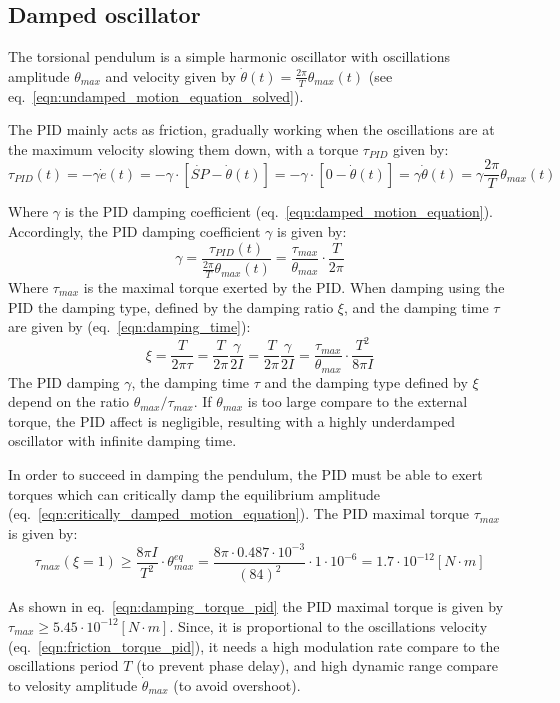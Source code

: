 \documentclass[\main/master.tex]{subfiles}
\begin{document}
\subsection{Damped oscillator}
The torsional pendulum is a simple harmonic oscillator with oscillations amplitude $\theta_{max}$ and velocity given by $\dot{\theta}(t) =\frac{2\pi}{T} \theta_{max}( t)$ (see eq.~\ref{eqn:undamped_motion_equation_solved}). 
\par\noindent
The PID mainly acts as friction, gradually working when the oscillations are at the maximum velocity slowing them down, with a torque $\tau_{PID}$ given by:
\begin{equation}
\tau_{PID}(t) = -\gamma\dot{e}(t) =  -\gamma\cdot [\dot{SP} -\dot{\theta}(t)] =-\gamma\cdot [0-\dot{\theta}(t)]  =  \gamma\dot{\theta}(t) =  \gamma\frac{2\pi}{T} \theta_{max}( t) 
\label{eqn:friction_torque_pid}
\end{equation}
\par\noindent
Where $\gamma$ is the PID damping coefficient (eq.~\ref{eqn:damped_motion_equation}). Accordingly, the PID damping coefficient $\gamma$ is given by:
\begin{equation}
\gamma  =  \frac{\tau_{PID}(t)}{\frac{2\pi}{T} \theta_{max}( t) } =\frac{\tau_{max}}{\theta_{max}}\cdot \frac{ T}{2\pi}          \label{eqn:damped_pid_motion_equation_2}
\end{equation}
Where $\tau_{max}$ is the maximal torque exerted by the PID. When damping using the PID the damping type, defined by the damping ratio $\xi$, and the damping time $\tau$ are given by (eq.~\ref{eqn:damping_time}):
\begin{equation}
\xi = \frac{T}{2 \pi \tau } =  \frac{T}{2 \pi  }\frac{\gamma}{2I} =\frac{T}{2 \pi  }\frac{\gamma}{2I} = \frac{ \tau_{max}}{\theta_{max}} \cdot \frac{T^2}{8\pi I}  \label{eqn:damping_time_pid}
\end{equation}
The PID damping $\gamma$, the damping time $\tau$ and the damping type defined by $\xi$ depend on the ratio $\theta_{max}/\tau_{max}$. If $\theta_{max}$ is too large compare to the external torque, the PID affect is negligible, resulting with a highly underdamped oscillator with infinite damping time. 
\par\noindent
In order to succeed in damping the pendulum, the PID must be able to exert torques which can critically damp the equilibrium amplitude (eq.~\ref{eqn:critically_damped_motion_equation}). The PID maximal torque $\tau_{max} $ is given by:
\begin{equation}
\tau_{max} (\xi = 1)\geq\frac{ 8 \pi I }{T^2}\cdot\theta_{max}^{eq} = \frac{  8 \pi \cdot 0.487\cdot10^{-3} }{(84)^2}\cdot 1\cdot10^{-6} = 1.7\cdot10^{-12}[N\cdot m]
\label{eqn:damping_torque_pid}
\end{equation}
\par\noindent
As shown in  eq.~\ref{eqn:damping_torque_pid} the PID maximal torque is given by $\tau_{max} \geq 5.45\cdot10^{-12}[N\cdot m]$. Since, it is proportional to the oscillations velocity (eq.~\ref{eqn:friction_torque_pid}), it needs a high modulation rate compare to the oscillations period $T$ (to prevent phase delay), and high dynamic range compare to velosity amplitude $\dot{\theta}_{max}$ (to avoid overshoot). 
\end{document}

